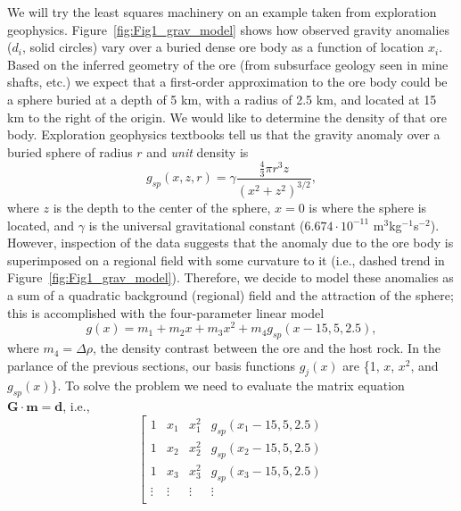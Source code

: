 \begin{example}
We will try the least squares machinery on an example taken from exploration geophysics.
Figure~\ref{fig:Fig1_grav_model} shows how observed gravity anomalies ($d_i$, solid circles) vary
over a buried dense ore body as a function of location $x_i$.
Based on the inferred geometry of the ore (from subsurface geology seen in mine shafts, etc.) we
expect that a first-order approximation to the ore body could be a sphere buried at a depth of 5 km, with
a radius of 2.5 km, and located at 15 km to the right of the origin.  We would like to determine
the density of that ore body.  Exploration geophysics textbooks tell us that the gravity anomaly over
a buried sphere of radius $r$ and \emph{unit} density is
\begin{equation}
g_{sp}(x, z, r) = \gamma \frac{\frac{4}{3}\pi r^3 z}{(x^2 + z^2)^{3/2}},
\end{equation}	 
where $z$ is the depth to the center of the sphere, $x = 0$ is where the sphere is located, and $\gamma$
is the universal gravitational constant ($6.674\cdot10^{-11}$ m$^3$kg$^{-1}$s$^{-2}$).  However, 
inspection of the data suggests that the anomaly due to the ore body is superimposed on a regional field
with some curvature to it (i.e., dashed trend in Figure~\ref{fig:Fig1_grav_model}).  Therefore, we decide to model
these anomalies as a sum of a quadratic background (regional) field and the attraction of the sphere;
this is accomplished with the four-parameter linear model
\begin{equation}
g(x) = m_1 + m_2 x + m_3 x^2 + m_4 g_{sp}(x-15, 5, 2.5),
\end{equation}	 
where $m_4 = \Delta \rho$, the density contrast between the ore and the host rock.  In the parlance of
the previous sections, our basis functions $g_j(x)$ are \{1, $x$, $x^2$, and $g_{sp}(x)$\}.  To solve the
problem we need to evaluate the matrix equation $\mathbf{G \cdot m = d}$, i.e.,
\begin{equation}
\left[ \begin{array}{cccc}
1 & x_1 & x_1^2 & g_{sp}(x_1-15,5, 2.5) \\[5pt]
1 & x_2 & x_2^2 & g_{sp}(x_2-15,5, 2.5) \\[5pt]
1 & x_3 & x_3^2 & g_{sp}(x_3-15,5, 2.5) \\[5pt]
\vdots	&	\vdots & \vdots & \vdots \\

\end{array}
\end{equation}
\end{example}
